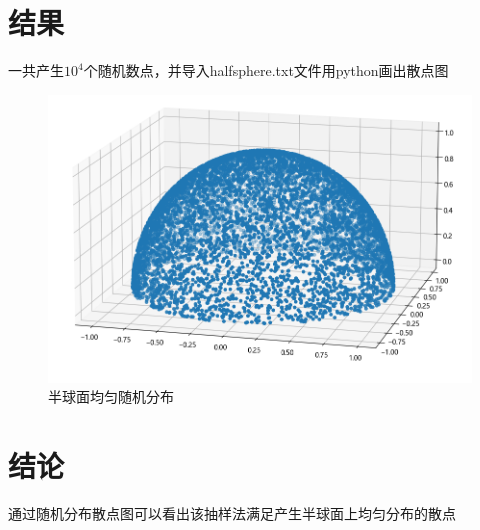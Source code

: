 \documentclass{article}
\begin{document}
	\section{结果}
一共产生$ 10^4 $个随机数点，并导入halfsphere.txt文件用python画出散点图
\begin{figure}[!h]
	
	\centering
	\includegraphics[scale=0.5]{result_3}
	\caption{\heiti{}半球面均匀随机分布}
	
\end{figure}


	\section{结论}
	通过随机分布散点图可以看出该抽样法满足产生半球面上均匀分布的散点
\end{document}
